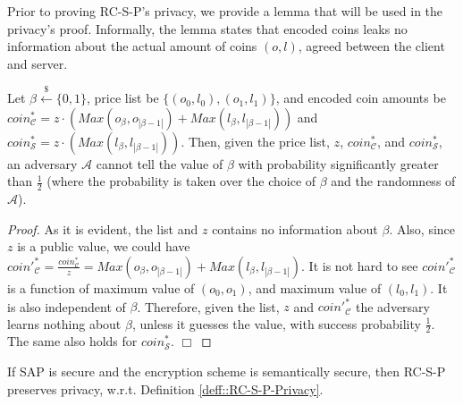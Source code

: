   
  Prior to proving  RC-S-P's privacy, we provide a lemma that will be used in the privacy's proof. Informally, the lemma states that encoded coins leaks no information about the actual amount of coins $(o,l)$, agreed between the client and server. 


\begin{lemma}\label{lemma::encoded-coins} Let $\beta\stackrel{\scriptscriptstyle\$}\leftarrow\{0,1\}$, price list be $\{(o_{\scriptscriptstyle 0},l_{\scriptscriptstyle 0}),(o_{\scriptscriptstyle 1},l_{\scriptscriptstyle 1})\}$, and encoded coin amounts be $coin^{\scriptscriptstyle *}_{\scriptscriptstyle\mathcal{C}}= z\cdot(Max(o_{\scriptscriptstyle\beta},o_{\scriptscriptstyle|\beta-1|})+Max(l_{\scriptscriptstyle\beta},l_{\scriptscriptstyle|\beta-1|}))$ and $coin^{\scriptscriptstyle *}_{\scriptscriptstyle\mathcal{S}}=z\cdot(Max(l_{\scriptscriptstyle\beta}, l_{\scriptscriptstyle |\beta-1|}))$. Then, given the price list, $z$, $coin^{\scriptscriptstyle *}_{\scriptscriptstyle\mathcal{C}}$, and $coin^{\scriptscriptstyle *}_{\scriptscriptstyle\mathcal{S}}$, an adversary $\mathcal{A}$ cannot tell the value of $\beta$ with probability significantly greater than $\frac{1}{2}$ (where the probability is taken over the choice of $\beta$ and the randomness of $\mathcal{A}$).
\end{lemma}



\begin{proof}
As it is evident, the list and $z$ contains no information about $\beta$. Also, since  $z$ is a public value, we could have   $coin'^{\scriptscriptstyle *}_{\scriptscriptstyle\mathcal C}=\frac{coin^{\scriptscriptstyle *}_{\scriptscriptstyle\mathcal C}}{z} = Max(o_{\scriptscriptstyle\beta},o_{\scriptscriptstyle|\beta-1|})+Max(l_{\scriptscriptstyle\beta}, l_{\scriptscriptstyle|\beta-1|})$. It is not hard to see $coin'^{\scriptscriptstyle *}_{\scriptscriptstyle\mathcal C}$ is a function of maximum value of $(o_{\scriptscriptstyle 0},o_{\scriptscriptstyle 1})$, and maximum value of $(l_{\scriptscriptstyle 0},l_{\scriptscriptstyle 1})$. It is also  independent of $\beta$. Therefore, given the list, $z$ and $coin'^{\scriptscriptstyle *}_{\scriptscriptstyle\mathcal C}$ the adversary learns nothing about $\beta$, unless it guesses the value,  with  success probability $\frac{1}{2}$. The same also holds for $coin^{\scriptscriptstyle *}_{\scriptscriptstyle\mathcal S}$. 
 \hfill\(\Box\)\end{proof}


\begin{lemma}\label{lem::RC-S-P-Privacy} If SAP is secure and the encryption scheme is semantically secure, then RC-S-P preserves privacy, w.r.t. Definition \ref{deff::RC-S-P-Privacy}. 
\end{lemma}

